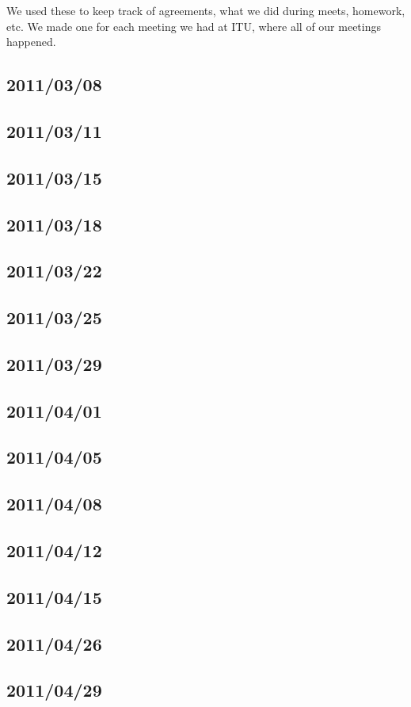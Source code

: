 We used these to keep track of agreements, what we did during meets, homework,
etc. We made one for each meeting we had at ITU, where all of our
meetings happened.
\subsection{2011/03/08}
\label{20110308}
\subsection{2011/03/11}
\subsection{2011/03/15}
\subsection{2011/03/18}
\subsection{2011/03/22}
\subsection{2011/03/25}
\subsection{2011/03/29}
\subsection{2011/04/01}
\subsection{2011/04/05}
\subsection{2011/04/08}
\subsection{2011/04/12}
\subsection{2011/04/15}
\subsection{2011/04/26}
\subsection{2011/04/29}
